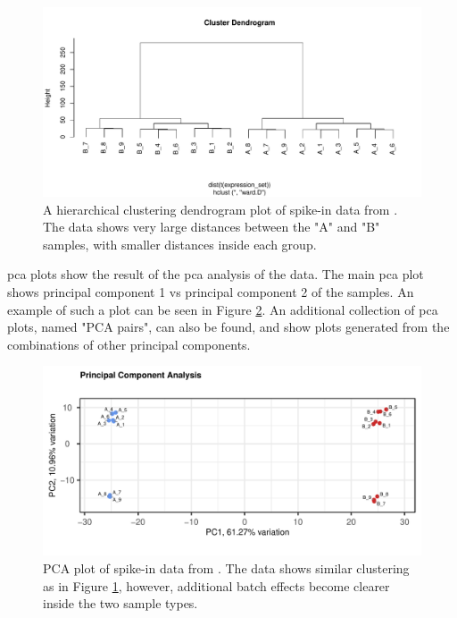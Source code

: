 \begin{figure}
    \centering
    \includegraphics{resources/images/4_Dendrogram - original.pdf}
    \caption{A hierarchical clustering dendrogram plot of spike-in data from \textcite{zhuPreferredAnalysisMethods2010}. The data shows very large distances between the "A" and "B" samples, with smaller distances inside each group.}
    \label{fig:ClusterDendro}
\end{figure}

\gls{pca} plots show the result of the \gls{pca} analysis of the data. The main \gls{pca} plot shows principal component 1 vs principal component 2 of the samples. An example of such a plot can be seen in Figure \ref{fig:PCAplot}. An additional collection of \gls{pca} plots, named "PCA pairs", can also be found, and show plots generated from the combinations of other principal components.

\begin{figure}
    \centering
    \includegraphics{resources/images/6_PCA - original.pdf}
    \caption{PCA plot of spike-in data from \textcite{zhuPreferredAnalysisMethods2010}. The data shows similar clustering as in Figure \ref{fig:ClusterDendro}, however, additional batch effects become clearer inside the two sample types.}
    \label{fig:PCAplot}
\end{figure}


